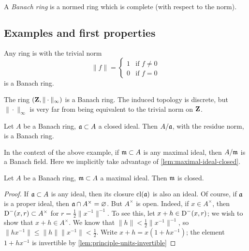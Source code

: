 \begin{definition}
A \emph{Banach ring} is a normed ring which is complete (with respect to the 
norm). 
\end{definition}


\subsection{Examples and first properties}

\begin{example}
Any ring is with the trivial norm 
\[
  \|f\| = \begin{cases} 1 & \text{if }f\ne 0 \\ 0 & \text{if }f=0 \end{cases}
\]
is a Banach ring. 
\end{example}

\begin{example}
The ring $(\mathbf{Z},\|\cdot\|_\infty)$ is a Banach ring. The induced topology is 
discrete, but $\|\cdot\|_\infty$ is very far from being equivalent to the 
trivial norm on $\mathbf{Z}$. 
\end{example}

\begin{example}
Let $A$ be a Banach ring, $\mathfrak{a}\subset A$ a closed ideal. Then $A/\mathfrak{a}$, with the 
residue norm, is a Banach ring. 
\end{example}

\begin{example}
In the context of the above example, if $\mathfrak{m}\subset A$ is any maximal ideal, 
then $A/\mathfrak{m}$ is a Banach field. Here we implicitly take advantage of 
\autoref{lem:maximal-ideal-closed}. 
\end{example}

\begin{lemma}\label{lem:maximal-ideal-closed}
Let $A$ be a Banach ring, $\mathfrak{m}\subset A$ a maximal ideal. Then $\mathfrak{m}$ is closed. 
\end{lemma}
\begin{proof}
If $\mathfrak{a}\subset A$ is any ideal, then its closure $\operatorname{cl}(\mathfrak{a})$ is also an 
ideal. Of course, if $\mathfrak{a}$ is a proper ideal, then 
$\mathfrak{a}\cap A^\times=\varnothing$. But $A^\times$ is open. Indeed, if 
$x\in A^\times$, then $\operatorname{D}^-(x,r)\subset A^\times$ for 
$r=\frac 1 2 \|x^{-1}\|^{-1}$. To see this, let $x+h\in \operatorname{D}^-(x,r)$; we wish 
to show that $x+h\in A^\times$. We know that $\|h\|<\frac 1 2 \|x^{-1}\|^{-1}$, 
so $\|h x^{-1}\| \leqslant \|h\| \|x^{-1}\| < \frac 1 2$. Write 
$x+h=x(1+h x^{-1})$; the element $1+h x^{-1}$ is invertible by 
\autoref{lem:principle-units-invertible}
\end{proof}

